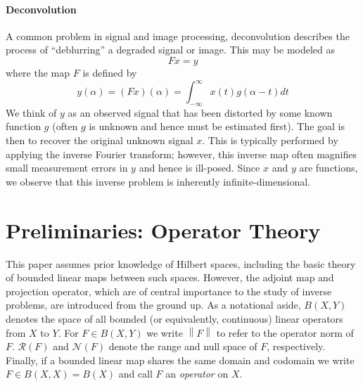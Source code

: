 \documentclass[12pt]{article}
\newcommand*{\norm}[1]{\left\lVert#1\right\rVert}
\begin{document}
  \paragraph*{Deconvolution}
 A common problem in signal and image processing, deconvolution describes the process of 
 ``deblurring'' a degraded signal or image. This may be modeled as 
 \[Fx = y\]
 where the map $F$ is defined by 
 \[y(\alpha) = (Fx)(\alpha) = \int_{-\infty}^{\infty} x(t)g(\alpha - t) dt\]
 We think of $y$ as an observed signal that has been distorted by some known function $g$ (often $g$ 
 is unknown and hence must be estimated first). The goal is then to recover the original unknown signal $x$.
 This is typically performed by applying the inverse Fourier transform; however, this inverse map often
 magnifies small measurement errors in $y$ and hence is ill-posed. Since $x$ and $y$ are functions, 
 we observe that this inverse problem is inherently infinite-dimensional. 

 
 \section{Preliminaries: Operator Theory} \label{preliminaries}
 This paper assumes prior knowledge of Hilbert spaces, including the basic theory of bounded 
 linear maps between such spaces. However, the adjoint map and projection operator, which are of central importance 
 to the study of inverse problems, are introduced from the ground up. As a notational aside, $B(X, Y)$ denotes the space of all bounded
 (or equivalently, continuous) linear operators from $X$ to $Y$. For $F \in B(X, Y)$ we write $\norm{F}$
 to refer to the operator norm of $F$. $\mathcal{R}(F)$ and $\mathcal{N}(F)$ denote the range and 
 null space of $F$, respectively. Finally, if a bounded linear map shares the same domain and codomain we write 
 $F \in B(X, X) = B(X)$ and call $F$ an \textit{operator} on $X$. 
 
\end{document}
